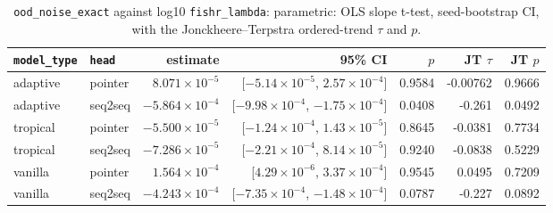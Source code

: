 \documentclass[10pt]{article}
\begin{document}
{\small
\begin{longtable}{llrrrrr}
\caption{\texttt{ood\_noise\_exact} against log10 \texttt{fishr\_lambda}: parametric: OLS slope t-test, seed-bootstrap CI, with the Jonckheere--Terpstra ordered-trend $\tau$ and $p$.}\label{tab:trend-ood_noise_exact}\\
\toprule
\texttt{model\_type} & \texttt{head} & estimate & 95\% CI & $p$ & JT $\tau$ & JT $p$\\
\midrule
\endhead
adaptive & pointer & $8.071\times10^{-5}$ & [$-5.14\times10^{-5}$, $2.57\times10^{-4}$] & 0.9584 & -0.00762 & 0.9666\\
adaptive & seq2seq & $-5.864\times10^{-4}$ & [$-9.98\times10^{-4}$, $-1.75\times10^{-4}$] & 0.0408 & -0.261 & 0.0492\\
tropical & pointer & $-5.500\times10^{-5}$ & [$-1.24\times10^{-4}$, $1.43\times10^{-5}$] & 0.8645 & -0.0381 & 0.7734\\
tropical & seq2seq & $-7.286\times10^{-5}$ & [$-2.21\times10^{-4}$, $8.14\times10^{-5}$] & 0.9240 & -0.0838 & 0.5229\\
vanilla & pointer & $1.564\times10^{-4}$ & [$4.29\times10^{-6}$, $3.37\times10^{-4}$] & 0.9545 & 0.0495 & 0.7209\\
vanilla & seq2seq & $-4.243\times10^{-4}$ & [$-7.35\times10^{-4}$, $-1.48\times10^{-4}$] & 0.0787 & -0.227 & 0.0892\\
\bottomrule
\end{longtable}
}
\end{document}
